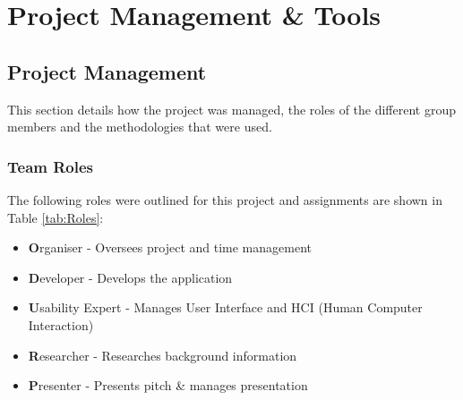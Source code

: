 \section{Project Management \& Tools}

\subsection{Project Management}
This section details how the project was managed, the roles of the different group members and the methodologies that were used.

\subsubsection{Team Roles}
The following roles were outlined for this project and assignments are shown in Table \ref{tab:Roles}:

\begin{itemize}[noitemsep,leftmargin=1cm]
	\item{\textbf{O}rganiser - Oversees project and time management}
	\item{\textbf{D}eveloper - Develops the application}
	\item{\textbf{U}sability Expert - Manages User Interface and HCI (Human Computer Interaction)}
	\item{\textbf{R}esearcher - Researches background information}
	\item{\textbf{P}resenter - Presents pitch \& manages presentation}
\end{itemize}

